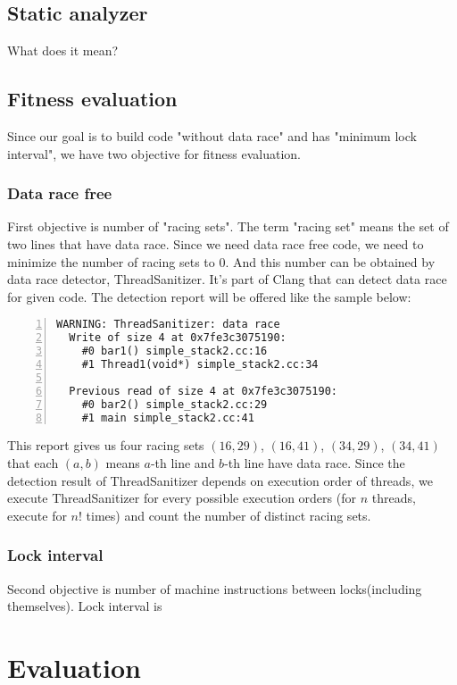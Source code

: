 \documentclass[sigconf]{acmart}
\begin{document}
\subsection{Static analyzer}
What does it mean?

\subsection{Fitness evaluation}
Since our goal is to build code "without data race" and has "minimum lock interval", we have two objective for fitness evaluation. 

\subsubsection{Data race free}
First objective is number of "racing sets". The term "racing set" means the set of two lines that have data race. Since we need data race free code, we need to minimize the number of racing sets to 0. And this number can be obtained by data race detector, ThreadSanitizer. It's part of Clang that can detect data race for given code. The detection report will be offered like the sample below:

\begin{lstlisting}[frame=tb, xleftmargin=2em, framexleftmargin=1.5em, numbers=left]
WARNING: ThreadSanitizer: data race
  Write of size 4 at 0x7fe3c3075190:
    #0 bar1() simple_stack2.cc:16
    #1 Thread1(void*) simple_stack2.cc:34

  Previous read of size 4 at 0x7fe3c3075190:
    #0 bar2() simple_stack2.cc:29
    #1 main simple_stack2.cc:41
\end{lstlisting}

This report gives us four racing sets $(16, 29)$, $(16, 41)$, $(34, 29)$, $(34, 41)$ that each $(a, b)$ means $a$-th line and $b$-th line have data race. Since the detection result of ThreadSanitizer depends on execution order of threads, we execute ThreadSanitizer for every possible execution orders (for $n$ threads, execute for $n!$ times) and count the number of distinct racing sets.
 
\subsubsection{Lock interval}
Second objective is number of machine instructions between locks(including themselves). Lock interval is 

\section{Evaluation}
\end{document}
